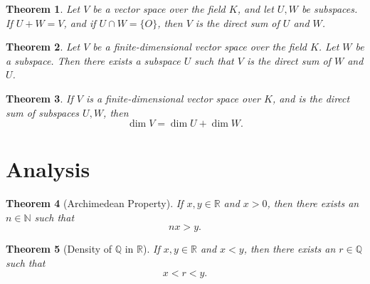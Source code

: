 \documentclass{article}
\newtheorem{theorem}{Theorem}[section]
\theoremstyle{definition}
\theoremstyle{remark}
\begin{document}
\begin{theorem} \label{thm:direct_sum_condition}
Let \( V \) be a vector space over the field \( K \), and let \( U, W \) be subspaces. If \( U + W = V \), and if \( U \cap W = \{ O \} \), then \( V \) is the \textit{direct sum} of \( U \) and \( W \).
\end{theorem}

\begin{theorem} \label{thm:direct_sum_existence}
Let \( V \) be a finite-dimensional vector space over the field \( K \). Let \( W \) be a subspace. Then there exists a subspace \( U \) such that \( V \) is the direct sum of \( W \) and \( U \).
\end{theorem}

\begin{theorem} \label{thm:direct_sum_dimension}
If \( V \) is a finite-dimensional vector space over \( K \), and is the direct sum of subspaces \( U, W \), then
\[
\dim V = \dim U + \dim W.
\]
\end{theorem}




























\section{Analysis}

\begin{theorem}[Archimedean Property] \label{thm:archimedean_property} 
If \( x, y \in \mathbb{R} \) and \( x > 0 \), then there exists an \( n \in \mathbb{N} \) such that
\[
nx > y.
\]
\end{theorem}




\begin{theorem}[Density of \( \mathbb{Q} \) in \( \mathbb{R} \)] \label{thm:density_of_rationals}
If \( x, y \in \mathbb{R} \) and \( x < y \), then there exists an \( r \in \mathbb{Q} \) such that
\[
x < r < y.
\]
\end{theorem}
\end{document}

